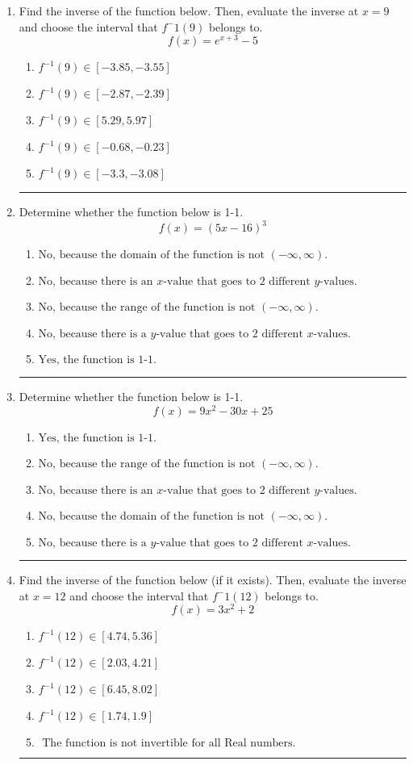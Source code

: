 \documentclass[14pt]{extbook}
\newcommand{\litem}[1]{\item#1\hspace*{-1cm}\rule{\textwidth}{0.4pt}}
\begin{document}
\begin{enumerate}
{\begin{enumerate}[label=\Alph*.]
\end{enumerate} }
\litem{
Find the inverse of the function below. Then, evaluate the inverse at $x = 9$ and choose the interval that $f^-1(9)$ belongs to.\[ f(x) = e^{x+3}-5 \]\begin{enumerate}[label=\Alph*.]
\item \( f^{-1}(9) \in [-3.85, -3.55] \)
\item \( f^{-1}(9) \in [-2.87, -2.39] \)
\item \( f^{-1}(9) \in [5.29, 5.97] \)
\item \( f^{-1}(9) \in [-0.68, -0.23] \)
\item \( f^{-1}(9) \in [-3.3, -3.08] \)

\end{enumerate} }
\litem{
Determine whether the function below is 1-1.\[ f(x) = (5 x - 16)^3 \]\begin{enumerate}[label=\Alph*.]
\item \( \text{No, because the domain of the function is not $(-\infty, \infty)$.} \)
\item \( \text{No, because there is an $x$-value that goes to 2 different $y$-values.} \)
\item \( \text{No, because the range of the function is not $(-\infty, \infty)$.} \)
\item \( \text{No, because there is a $y$-value that goes to 2 different $x$-values.} \)
\item \( \text{Yes, the function is 1-1.} \)

\end{enumerate} }
\litem{
Determine whether the function below is 1-1.\[ f(x) = 9 x^2 - 30 x + 25 \]\begin{enumerate}[label=\Alph*.]
\item \( \text{Yes, the function is 1-1.} \)
\item \( \text{No, because the range of the function is not $(-\infty, \infty)$.} \)
\item \( \text{No, because there is an $x$-value that goes to 2 different $y$-values.} \)
\item \( \text{No, because the domain of the function is not $(-\infty, \infty)$.} \)
\item \( \text{No, because there is a $y$-value that goes to 2 different $x$-values.} \)

\end{enumerate} }
\litem{
Find the inverse of the function below (if it exists). Then, evaluate the inverse at $x = 12$ and choose the interval that $f^-1(12)$ belongs to.\[ f(x) = 3 x^2 + 2 \]\begin{enumerate}[label=\Alph*.]
\item \( f^{-1}(12) \in [4.74, 5.36] \)
\item \( f^{-1}(12) \in [2.03, 4.21] \)
\item \( f^{-1}(12) \in [6.45, 8.02] \)
\item \( f^{-1}(12) \in [1.74, 1.9] \)
\item \( \text{ The function is not invertible for all Real numbers. } \)


\end{enumerate}}
\end{enumerate}
\end{document}
